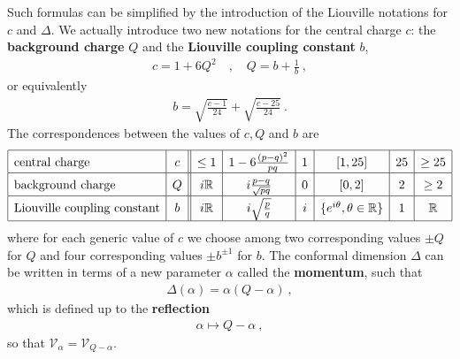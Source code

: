 \documentclass[12pt,a4paper,notitlepage]{report}
\newcommand \R {\mathbb{R}}
\numberwithin{equation}{section}
\theoremstyle{break}
\begin{document}
Such formulas can be simplified by the introduction of the Liouville notations for $c$ and $\Delta$. We actually introduce two new notations for the central charge $c$: the \textbf{\boldmath background charge} $Q$ and the \textbf{\boldmath Liouville coupling constant} $b$,
\begin{align}
\boxed{ c= 1+6Q^2 }\quad , \quad \boxed{Q = b+\frac{1}{b}}\ ,
\label{cqb}
\end{align}
or equivalently
\begin{align}
 b = \sqrt{\frac{c-1}{24}} + \sqrt{\frac{c-25}{24}}\ .
\end{align}
The correspondences between the values of $c,Q$ and $b$ are 
\begin{align}
\renewcommand{\arraystretch}{1.5}
 \begin{array}{|l|c||c|c|c|c|c|c|}
  \hline
  \text{central\ charge} & c & \leq 1 & 1-6\frac{(p-q)^2}{pq} & 1 & [1,25] & 25 & \geq 25 
\\
\hline
\text{background\ charge} & Q & i\R & i\frac{p-q}{\sqrt{pq}} & 0 & [0,2] & 2 & \geq 2 
\\
\hline
\text{Liouville\ coupling\ constant} &
b& i\R & i\sqrt{\frac{p}{q}} & i & \{e^{i\theta},\theta\in\R\} & 1 & \R
\\
\hline
 \end{array}
\label{cqbval}
\end{align}
where for each generic value of $c$ we choose among two corresponding values $\pm Q$ for $Q$ and four corresponding values $\pm b^{\pm 1}$ for $b$. The conformal dimension $\Delta$ can be written in terms of a 
new parameter $\alpha$ called the \textbf{\boldmath momentum}, such that 
\begin{align}
 \boxed{\Delta(\alpha) = \alpha(Q-\alpha)}\ ,
\label{daq}
\end{align}
which is defined up to the \textbf{\boldmath reflection}
\begin{align}
 \alpha \mapsto Q-\alpha\ ,
\label{arqa}
\end{align}
so that $\mathcal{V}_\alpha = \mathcal{V}_{Q-\alpha}$.
\end{document}

